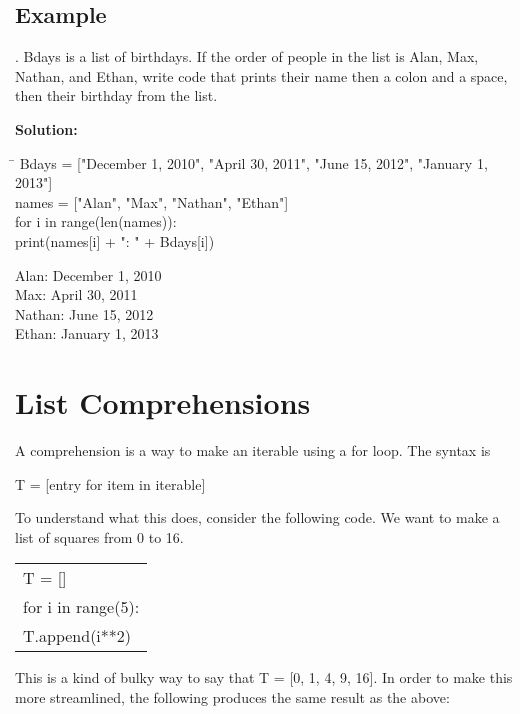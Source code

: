 \documentclass{article}
\newcommand{\define}[1]{\begin{center}\ttfamily #1\end{center}}
\newcommand{\icode}[1]{{\ttfamily #1}}
\newenvironment{code}{\begin{tcolorbox}\ttfamily}{\end{tcolorbox}}
\newenvironment{out}{\begin{tcolorbox}[colback=output]\ttfamily}{\end{tcolorbox}}
\begin{document}
\subsection{Example}
. {\ttfamily Bdays} is a list of birthdays. If the order of people in the list is Alan, Max, Nathan, and Ethan, write code that prints their name then a colon and a space, then their birthday from the list.
\vspace{1 mm}

\noindent\textbf{Solution:}
\begin{code}
	\begin{tabbing}
		\hspace{3.25 in}\=\hspace{3.25 in} \kill
		Bdays = ["December 1, 2010", "April 30, 2011", "June 15, 2012", "January 1, 2013"]\>\\
		names = ["Alan", "Max", "Nathan", "Ethan"]\>\\
		for i in range(len(names)):\>\\
		\hspace{2 em}print(names[i] + ": " + Bdays[i])
	\end{tabbing}
\end{code}
\begin{out}
	Alan: December 1, 2010\\
	Max: April 30, 2011\\
	Nathan: June 15, 2012\\
	Ethan: January 1, 2013
\end{out}
\vspace{.5 cm}

\section{List Comprehensions}
A comprehension is a way to make an iterable using a \icode{for} loop. The syntax is 
\define{T = [entry for item in iterable]}
To understand what this does, consider the following code. We want to make a list of squares from 0 to 16.

\begin{center} \ttfamily
	\begin{tabular}{|l}
		T = []\\
		for i in range(5):\\
		\hspace{2 em}T.append(i**2)
	\end{tabular}
\end{center}
This is a kind of bulky way to say that \icode{T = [0, 1, 4, 9, 16]}. In order to make this more streamlined, the following produces the same result as the above:
\end{document}
